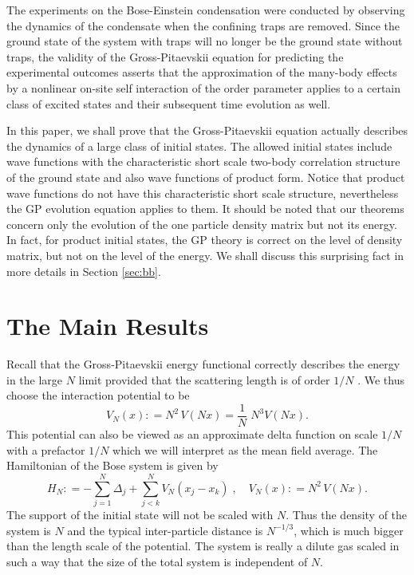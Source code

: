 \documentclass[11pt]{article}
\begin{document}
The experiments on the Bose-Einstein condensation were conducted by
observing the dynamics of the condensate when the confining traps
are removed. Since the ground state of the system with traps will no
longer be  the ground state without traps, the validity of the
Gross-Pitaevskii equation for predicting the experimental outcomes
asserts that the approximation of the
many-body effects  by a nonlinear on-site self interaction of the
order parameter applies to a certain class of excited states and
their subsequent time evolution as well.

In this paper, we shall prove that the Gross-Pitaevskii equation
actually describes the dynamics of a large class of initial states.
The allowed initial states include wave functions with the
characteristic short scale two-body correlation structure of the
ground state and also wave functions of product form. Notice that
product wave functions do not have this characteristic short scale
structure,  nevertheless the GP evolution equation applies to them.
It should be noted that our theorems concern only the evolution of
the  one particle density matrix but not its energy. In fact,  for
product initial states, the GP theory is correct on the level of
density matrix, but not on the level of the energy. We shall discuss
this surprising fact in more details in Section \ref{sec:bb}.


\section{The Main Results}\label{sec:main}
\setcounter{equation}{0}



Recall that the Gross-Pitaevskii energy functional correctly
describes the energy in the large $N$ limit provided that the
scattering length is of order $1/N$ \cite{LSY1}. We thus choose the
interaction potential to be
$$
 V_N (x): = N^2 \, V \left( N x\right) = \frac{1}{N}  \;
 N^3 V \left( N x\right).
$$
This potential can also be viewed as an approximate delta function
on scale $1/N$ with a  prefactor $1/N$ which we will interpret as
the mean field average. The Hamiltonian of the Bose system is given
by
\begin{equation}\label{eq:ham1}
H_N: = - \sum_{j=1}^N \Delta_j + \sum_{j < k}^N V_N (x_j - x_k)\; ,
\quad V_N (x): = N^2 \, V \left( N x\right) .
\end{equation}
The support of the initial state will not be scaled with $N$. Thus
the density of the system is $N$ and the typical inter-particle
distance is $N^{-1/3}$, which is much bigger than the length scale
of the potential. The system is really
 a dilute gas scaled in such
a way that the size of the total system is independent of $N$.
\end{document}
